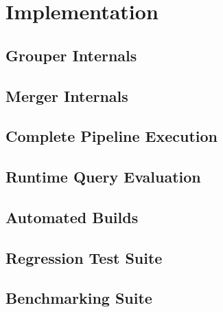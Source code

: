 \chapter{Implementation}\label{ch:implementation}

\section{Grouper Internals}\label{sec:grouper-internals}
\section{Merger Internals}\label{sec:merger-internals}
\section{Complete Pipeline Execution}\label{sec:robust-pipeline}
\section{Runtime Query Evaluation}\label{sec:runtime-query}
\section{Automated Builds}\label{sec:cmake}
\section{Regression Test Suite}\label{sec:cmake}
\section{Benchmarking Suite}\label{sec:cmake}
